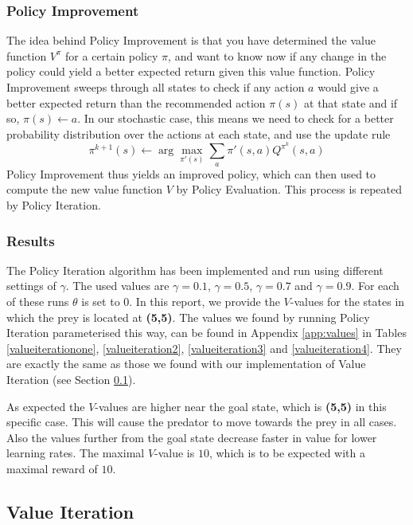 \documentclass{article}
\begin{document}
\subsubsection{Policy Improvement}\label{policyImprovement}
The idea behind Policy Improvement is that you have determined the value function $V^{\pi}$ for a certain policy $\pi$, and want to know now if any change in the policy could yield a better expected return given this value function. Policy Improvement sweeps through all states to check if any action  $a$ would give a better expected return than the recommended action $\pi(s)$ at that state and if so, $\pi(s) \leftarrow a$. In our stochastic case, this means we need to check for a better probability distribution over the actions at each state, and use the update rule
\begin{equation}
\pi^{k+1}(s) \leftarrow 
			\arg\max_{\pi'(s)} \sum_{a} \pi'(s,a) Q^{\pi^{k}}(s,a)
\end{equation}
Policy Improvement thus yields an improved policy, which can then used to compute the new value function $V$ by Policy Evaluation. This process is repeated by Policy Iteration.


\subsubsection{Results}
The Policy Iteration algorithm has been implemented and run using different settings of $\gamma$. The used values are $\gamma = 0.1$, $\gamma = 0.5$, $\gamma = 0.7$ and $\gamma = 0.9$. 
For each of these runs $\theta$ is set to 0. 
In this report, we provide the $V$-values for the states in which the prey is located at \textbf{(5,5)}. 
The values we found by running Policy Iteration parameterised this way, can be found in Appendix \ref{app:values} in Tables \ref{valueiterationone}, \ref{valueiteration2}, \ref{valueiteration3} and \ref{valueiteration4}. They are exactly the same as those we found with our implementation of Value Iteration (see Section \ref{sec:valueIteration}).

As expected the $V$-values are higher near the goal state, which is \textbf{(5,5)} in this specific case. This will cause the predator to move towards the prey in all cases. Also the values further from the goal state decrease faster in value for lower learning rates. The maximal $V$-value is $10$, which is to be expected with a maximal reward of $10$.



\subsection{Value Iteration}\label{sec:valueIteration}
\end{document}
